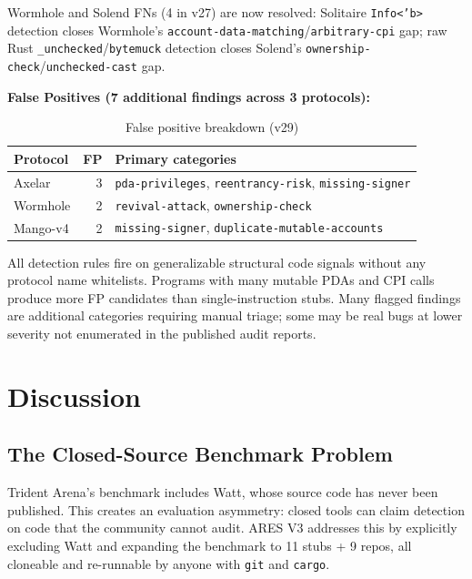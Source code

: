 \documentclass{article}
\begin{document}
Wormhole and Solend FNs (4 in v27) are now resolved: Solitaire \texttt{Info<'b>} detection closes Wormhole's \texttt{account-data-matching}/\texttt{arbitrary-cpi} gap; raw Rust \texttt{\_unchecked}/\texttt{bytemuck} detection closes Solend's \texttt{ownership-check}/\texttt{unchecked-cast} gap.

\textbf{False Positives (7 additional findings across 3 protocols):}

\begin{table}[H]
  \caption{False positive breakdown (v29)}
  \label{tab:fp}
  \centering
  \begin{tabular}{lrl}
    \toprule
    Protocol & FP & Primary categories \\
    \midrule
    Axelar & 3 & \texttt{pda-privileges}, \texttt{reentrancy-risk}, \texttt{missing-signer} \\
    Wormhole & 2 & \texttt{revival-attack}, \texttt{ownership-check} \\
    Mango-v4 & 2 & \texttt{missing-signer}, \texttt{duplicate-mutable-accounts} \\
    \bottomrule
  \end{tabular}
\end{table}

All detection rules fire on generalizable structural code signals without any protocol name whitelists. Programs with many mutable PDAs and CPI calls produce more FP candidates than single-instruction stubs. Many flagged findings are additional categories requiring manual triage; some may be real bugs at lower severity not enumerated in the published audit reports.


\section{Discussion}
\label{sec:discuss}

\subsection{The Closed-Source Benchmark Problem}

Trident Arena's benchmark includes Watt, whose source code has never been published. This creates an evaluation asymmetry: closed tools can claim detection on code that the community cannot audit. ARES V3 addresses this by explicitly excluding Watt and expanding the benchmark to 11 stubs + 9 repos, all cloneable and re-runnable by anyone with \texttt{git} and \texttt{cargo}.
\end{document}
